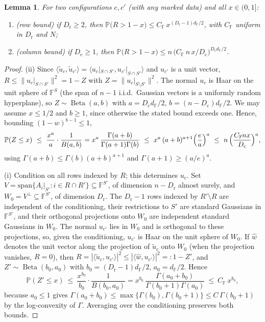 \documentclass[11pt,reqno]{amsart}
\theoremstyle{plain}
\newtheorem{lemma}[theorem]{Lemma}
\theoremstyle{definition}
\theoremstyle{remark}
\newcommand{\F}{\mathbb{F}}
\newcommand{\PP}{\mathbb{P}}
\newcommand{\dF}{d_{\F}}
\DeclareMathOperator{\Beta}{Beta}
\begin{document}
\begin{lemma}\label{lem:overlaptail}
For two configurations $c,c'$ (with any marked data) and all $x\in(0,1]$:
\begin{enumerate}
\item (row bound) if $D_{\mathrm r}\ge2$, then
  $\PP\bigl(R>1-x\bigr)\le C_\F\,x^{(D_{\mathrm r}-1)\dF/2}$, with $C_\F$ uniform in $D_{\mathrm r}$
  and $N$;
\item (column bound) if $D_{\mathrm c}\ge1$, then
  $\PP\bigl(R>1-x\bigr)\le n\,\bigl(C_\F\,n\,x/D_{\mathrm c}\bigr)^{D_{\mathrm c}\dF/2}$.
\end{enumerate}
\end{lemma}

\begin{proof}
(ii) Since $\langle\tilde u_c,\tilde u_{c'}\rangle=\langle u_c|_{S\cap S'},u_{c'}|_{S\cap
S'}\rangle$ and $u_{c'}$ is a unit vector, $R\le\|u_c|_{S\cap S'}\|^2=1-Z$ with
$Z=\|u_c|_{S\setminus S'}\|^2$. The normal $u_c$ is Haar on the unit sphere of $\F^S$ (the span of
$n-1$ i.i.d.\ Gaussian vectors is a uniformly random hyperplane), so
$Z\sim\Beta(a,b)$ with $a=D_{\mathrm c}\dF/2$, $b=(n-D_{\mathrm c})\dF/2$. We may assume $x\le1/2$
and $b\ge1$, since otherwise the stated bound exceeds one. Hence, bounding
$(1-w)^{b-1}\le1$,
\[
  \PP(Z\le x)\ \le\ \frac{x^a}a\cdot\frac1{B(a,b)}
  =x^a\,\frac{\Gamma(a+b)}{\Gamma(a+1)\Gamma(b)}
  \ \le\ x^a\,(a+b)^{a+1}\Bigl(\frac ea\Bigr)^a
  \ \le\ n\,\Bigl(\frac{C_\F nx}{D_{\mathrm c}}\Bigr)^{a},
\]
using $\Gamma(a+b)\le\Gamma(b)(a+b)^{a+1}$ and $\Gamma(a+1)\ge(a/e)^a$.

(i) Condition on all rows indexed by $R$; this determines $u_c$. Set
$V=\mathrm{span}\{A_i|_{S'}:i\in R\cap R'\}\subseteq\F^{S'}$, of dimension $n-D_{\mathrm r}$ almost
surely, and $W_0=V^\perp\subseteq\F^{S'}$, of dimension $D_{\mathrm r}$. The $D_{\mathrm r}-1$ rows
indexed by $R'\setminus R$ are independent of the conditioning, their restrictions to $S'$ are
standard Gaussians in $\F^{S'}$, and their orthogonal projections onto $W_0$ are independent
standard Gaussians in $W_0$. The normal $u_{c'}$ lies in $W_0$ and is orthogonal to these
projections, so, given the conditioning, $u_{c'}$ is Haar on the unit sphere of $W_0$. If
$\hat w$ denotes the unit vector along the projection of $\tilde u_c$ onto $W_0$ (when the
projection vanishes, $R=0$), then
$R=|\langle\tilde u_c,u_{c'}\rangle|^2\le|\langle\hat w,u_{c'}\rangle|^2=:1-Z'$, and
$Z'\sim\Beta(b_0,a_0)$ with $b_0=(D_{\mathrm r}-1)\dF/2$, $a_0=\dF/2$. Hence
\[
  \PP(Z'\le x)\ \le\ \frac{x^{b_0}}{b_0}\cdot\frac1{B(b_0,a_0)}
  =x^{b_0}\,\frac{\Gamma(a_0+b_0)}{\Gamma(b_0+1)\Gamma(a_0)}\ \le\ C_\F\,x^{b_0},
\]
because $a_0\le1$ gives $\Gamma(a_0+b_0)\le\max\{\Gamma(b_0),\Gamma(b_0+1)\}\le
C\,\Gamma(b_0+1)$ by the log-convexity of $\Gamma$. Averaging over the conditioning preserves both
bounds.
\end{proof}
\end{document}

